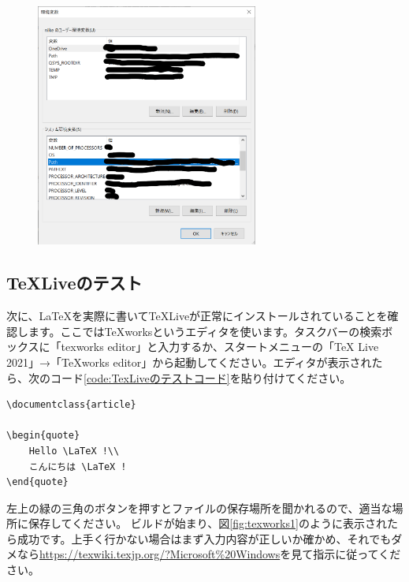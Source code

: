 \begin{figure}[H]
    \centering
    \includegraphics[height=80mm]{img/path3.png}
    \caption{}
    \label{fig:path3}
\end{figure}

\subsection{\TeX Liveのテスト}\label{textest}
次に、\LaTeX を実際に書いて\TeX Liveが正常にインストールされていることを確認します。ここではTeXworksというエディタを使います。タスクバーの検索ボックスに「texworks editor」と入力するか、スタートメニューの「TeX Live 2021」→「TeXworks editor」から起動してください。エディタが表示されたら、次のコード\ref{code:TexLiveのテストコード}を貼り付けてください。

\begin{lstlisting}[language={[LaTeX]TeX}, caption=TeXLiveのテストコード, label=code:TexLiveのテストコード]
\documentclass{article}

\begin{quote}
    Hello \LaTeX !\\
    こんにちは \LaTeX !
\end{quote}

\end{lstlisting}

左上の緑の三角のボタンを押すとファイルの保存場所を聞かれるので、適当な場所に保存してください。 ビルドが始まり、図\ref{fig:texworks1}のように表示されたら成功です。上手く行かない場合はまず入力内容が正しいか確かめ、それでもダメなら\url{https://texwiki.texjp.org/?Microsoft%20Windows}を見て指示に従ってください。

